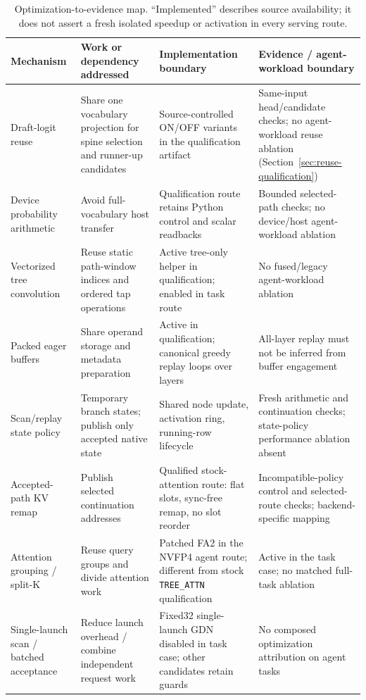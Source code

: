\documentclass[conference]{IEEEtran}
\begin{document}
\begin{table}[t]
\caption{Optimization-to-evidence map. ``Implemented'' describes source availability; it does not assert a fresh isolated speedup or activation in every serving route.}
\label{tab:optimization-map}
\centering\footnotesize
\begin{tabularx}{\textwidth}{@{}p{}p{}YY@{}}
\toprule
Mechanism & Work or dependency addressed & Implementation boundary & Evidence / agent-workload boundary \\
\midrule
Draft-logit reuse & Share one vocabulary projection for spine selection and runner-up candidates & Source-controlled ON/OFF variants in the qualification artifact & Same-input head/candidate checks; no agent-workload reuse ablation (Section~\ref{sec:reuse-qualification}) \\
Device probability arithmetic & Avoid full-vocabulary host transfer & Qualification route retains Python control and scalar readbacks & Bounded selected-path checks; no device/host agent-workload ablation \\
Vectorized tree convolution & Reuse static path-window indices and ordered tap operations & Active tree-only helper in qualification; enabled in task route & No fused/legacy agent-workload ablation \\
Packed eager buffers & Share operand storage and metadata preparation & Active in qualification; canonical greedy replay loops over layers & All-layer replay must not be inferred from buffer engagement \\
Scan/replay state policy & Temporary branch states; publish only accepted native state & Shared node update, activation ring, running-row lifecycle & Fresh arithmetic and continuation checks; state-policy performance ablation absent \\
Accepted-path KV remap & Publish selected continuation addresses & Qualified stock-attention route: flat slots, sync-free remap, no slot reorder & Incompatible-policy control and selected-route checks; backend-specific mapping \\
Attention grouping / split-K & Reuse query groups and divide attention work & Patched FA2 in the NVFP4 agent route; different from stock \texttt{TREE\_ATTN} qualification & Active in the task case; no matched full-task ablation \\
Single-launch scan / batched acceptance & Reduce launch overhead / combine independent request work & Fixed32 single-launch GDN disabled in task case; other candidates retain guards & No composed optimization attribution on agent tasks \\
\bottomrule
\end{tabularx}
\end{table}
\end{document}
